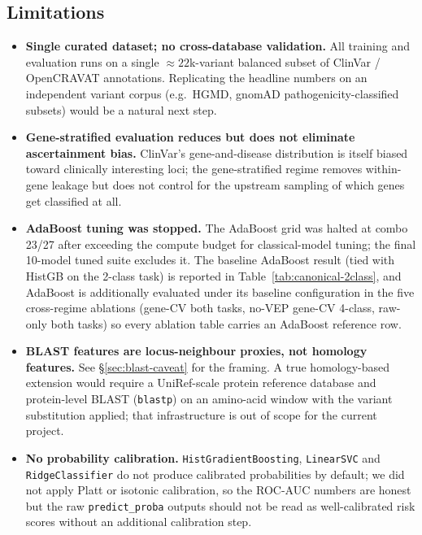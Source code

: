 \documentclass[11pt,a4paper]{article}
\begin{document}
\subsection{Limitations}

\begin{itemize}[leftmargin=*]
    \item \textbf{Single curated dataset; no cross-database validation.}
          All training and evaluation runs on a single
          $\approx 22$k-variant balanced subset of ClinVar / OpenCRAVAT
          annotations. Replicating the headline numbers on an independent
          variant corpus (e.g.\ HGMD, gnomAD pathogenicity-classified subsets)
          would be a natural next step.
    \item \textbf{Gene-stratified evaluation reduces but does not eliminate
          ascertainment bias.} ClinVar's gene-and-disease distribution is
          itself biased toward clinically interesting loci; the
          gene-stratified regime removes within-gene leakage but does not
          control for the upstream sampling of which genes get classified at all.
    \item \textbf{AdaBoost tuning was stopped.} The AdaBoost grid was halted
          at combo 23/27 after exceeding the compute budget for classical-model
          tuning; the final 10-model tuned suite excludes it. The baseline
          AdaBoost result (tied with HistGB on the 2-class task) is reported in
          Table~\ref{tab:canonical-2class}, and AdaBoost is additionally
          evaluated under its baseline configuration in the five cross-regime
          ablations (gene-CV both tasks, no-VEP gene-CV 4-class, raw-only both
          tasks) so every ablation table carries an AdaBoost reference row.
    \item \textbf{BLAST features are locus-neighbour proxies, not homology
          features.} See \S\ref{sec:blast-caveat} for the framing. A true
          homology-based extension would require a UniRef-scale protein
          reference database and protein-level BLAST (\texttt{blastp}) on an
          amino-acid window with the variant substitution applied; that
          infrastructure is out of scope for the current project.
    \item \textbf{No probability calibration.} \texttt{HistGradientBoosting},
          \texttt{LinearSVC} and \texttt{RidgeClassifier} do not produce
          calibrated probabilities by default; we did not apply Platt or
          isotonic calibration, so the ROC-AUC numbers are honest but the
          raw \texttt{predict\_proba} outputs should not be read as
          well-calibrated risk scores without an additional calibration step.
\end{itemize}
\end{document}
